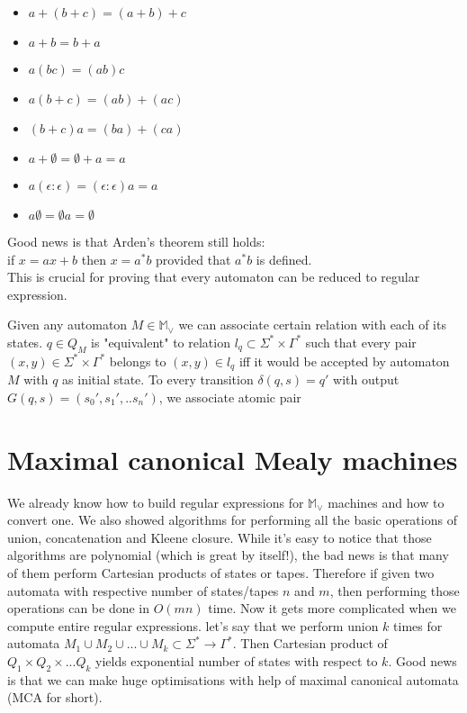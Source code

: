 \documentclass[12pt]{article}
\begin{document}
\begin{itemize}
	\item $a + (b + c) = (a + b) + c$ 
	\item $ a + b = b + a $
	\item $a(bc) = (ab)c$
	\item $a(b + c) = (ab) + (ac)$ 
	\item $(b + c)a = (ba) + (ca)$
	\item $a + \emptyset = \emptyset + a = a$
	\item $a (\epsilon:\epsilon) = (\epsilon:\epsilon) a = a$  
	\item $a\emptyset = \emptyset a = \emptyset$
\end{itemize}
Good news is that Arden's theorem still holds: \\
if $x = ax+b$ then $x=a^*b$ provided that $a^*b$ is defined. \\
This is crucial for proving that every automaton can be reduced to regular expression. 

Given any automaton $M\in \mathbb{ M}_\vee$ we can associate certain relation with each of its states. $q \in Q_M$ is "equivalent" to relation $l_q \subset \Sigma^* \times \Gamma^*$ such that every pair $(x,y) \in \Sigma^* \times \Gamma^*$ belongs to $(x,y) \in l_q$ iff it would be accepted by automaton $M$ with $q$ as initial state. To every transition $\delta(q,s) = q'$ with output $G(q,s) = (s_0',s_1',..s_n')$,  we associate atomic pair


\section{Maximal canonical Mealy machines}

We already know how to build regular expressions for $\mathbb{M}_\vee$ machines and how to convert one. We also showed algorithms for performing all the basic operations of union, concatenation and Kleene closure. While it's easy to notice that  those algorithms are polynomial (which is great by itself!), the bad news is that many of them perform Cartesian products of states or tapes. Therefore if given two automata with respective number of states/tapes $n$ and $m$, then performing those operations can be done in $O(mn)$ time. Now it gets more complicated when we compute entire regular expressions. let's say that we perform union $k$ times for automata $M_1 \cup M_2 \cup ... \cup M_k \subset \Sigma^* \rightarrow \Gamma^*$. Then Cartesian product of $Q_1 \times Q_2 \times... Q_k$ yields exponential number of states with respect to $k$. Good news is that we can make huge optimisations with help of maximal canonical automata (MCA for short). 
\end{document}
